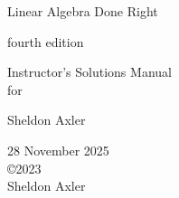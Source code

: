\documentclass[leqno,10pt]{book}
\begin{document}
















\begin{center}
{{\huge
\color{blue}Linear Algebra Done Right\par}

\bigskip

fourth edition

\bigskip

{\Large Instructor's Solutions Manual \\[8bp]for \instructor}}

\bigskip

\bigskip

\bigskip

\bigskip

{
{\huge \color{blue}Sheldon Axler
}

\vfill
28 November 2025\\
\copyright 2023\\
Sheldon Axler
}
\end{center}

\newpage

\thispagestyle{empty}
\end{document}
